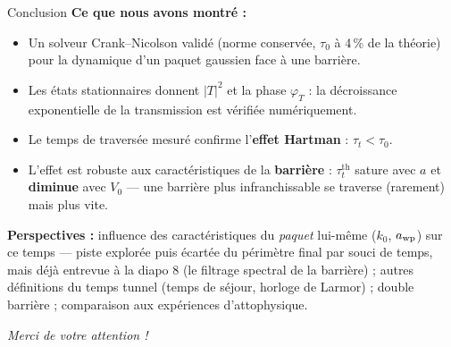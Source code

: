 \documentclass[10pt,aspectratio=169]{beamer}
\begin{document}
\begin{frame}{Conclusion}
  \textbf{Ce que nous avons montré :}
  \begin{itemize}
    \item Un solveur Crank--Nicolson validé (norme conservée, $\tau_0$ à 4\,\%
          de la théorie) pour la dynamique d'un paquet gaussien face à une
          barrière.
    \item Les états stationnaires donnent $|T|^2$ et la phase $\varphi_T$ :
          la décroissance exponentielle de la transmission est vérifiée
          numériquement.
    \item Le temps de traversée mesuré confirme l'\textbf{effet Hartman} :
          $\tau_t < \tau_0$.
    \item L'effet est robuste aux caractéristiques de la \textbf{barrière} :
          $\tau_t^{\text{th}}$ sature avec $a$ et \textbf{diminue} avec $V_0$ —
          une barrière plus infranchissable se traverse (rarement) mais
          plus vite.
  \end{itemize}
  \vspace{0.5em}
  \textbf{Perspectives :} influence des caractéristiques du \emph{paquet}
  lui-même ($k_0$, $a_{\rm wp}$) sur ce temps — piste explorée puis écartée
  du périmètre final par souci de temps, mais déjà entrevue à la diapo 8
  (le filtrage spectral de la barrière) ; autres définitions du temps
  tunnel (temps de séjour, horloge de Larmor) ; double barrière ;
  comparaison aux expériences d'attophysique.
  \vspace{0.8em}
  \begin{center}
    \emph{Merci de votre attention !}
  \end{center}
\end{frame}
\end{document}
